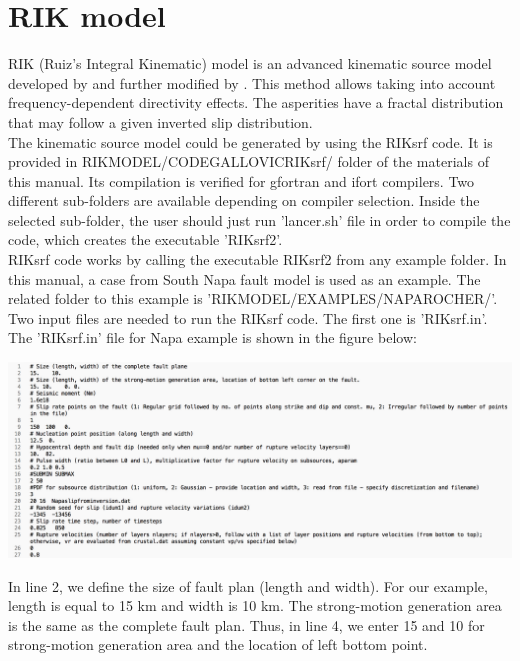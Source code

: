 \chapter{RIK model}
\label{chapRIK}


RIK (Ruiz's Integral Kinematic) model is an advanced kinematic source model developed by \cite{Ruiz2011} and further modified by \cite{Gallovic2016}. This method allows taking into account frequency-dependent directivity effects. The asperities have a fractal distribution that may follow a given inverted slip distribution. \\


The kinematic source model could be generated by using the RIKsrf code. It is provided in RIK\textunderscore MODEL/CODE\textunderscore GALLOVIC\textunderscore RIKsrf/ folder of the materials of this manual. Its compilation is verified for gfortran and ifort compilers. Two different sub-folders are available depending on compiler selection. Inside the selected sub-folder, the user should just run 'lancer.sh' file in order to compile the code, which creates the executable 'RIKsrf2'. \\ 


RIKsrf code works by calling the executable RIKsrf2 from any example folder. In this manual, a case from South Napa fault model is used as an example. The related folder to this example is 'RIK\textunderscore MODEL/EXAMPLES/NAPA\textunderscore ROCHER/'. Two input files are needed to run the RIKsrf code. The first one is 'RIKsrf.in'. The 'RIKsrf.in' file for Napa example is shown in the figure below:


\begin{center}
\leavevmode
\includegraphics[scale=0.45]{figures/RIK-input1.png} 
\label{rik1} 
\vspace{1cm}
\end{center}



In line 2, we define the size of fault plan (length and width). For our example, length is equal to 15 km and width is 10 km. The strong-motion generation area is the same as the complete fault plan. Thus, in line 4, we enter 15 and 10 for strong-motion generation area and the location of left bottom point. \\

